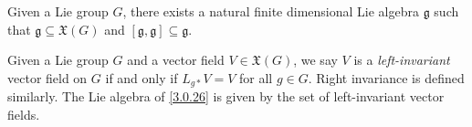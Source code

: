 \begin{proposition}\label{3.0.26}
	Given a Lie group $G$,  there exists a natural finite dimensional Lie algebra $\mathfrak{g} $ such that $\mathfrak{g} \subseteq \mathfrak{X} (G)$ and $[\mathfrak{g} ,\mathfrak{g} ]\subseteq \mathfrak{g} $.
\end{proposition}

\begin{definition}\label{3.0.27}
	Given a Lie group $G$ and a vector field $V\in \mathfrak{X} (G)$, we say $V$ is a \emph{left-invariant} vector field on $G$ if and only if $L_{g*} V=V$ for all $g\in G$. Right invariance is defined similarly. The Lie algebra of \cref{3.0.26} is given by the set of left-invariant vector fields.
\end{definition}


